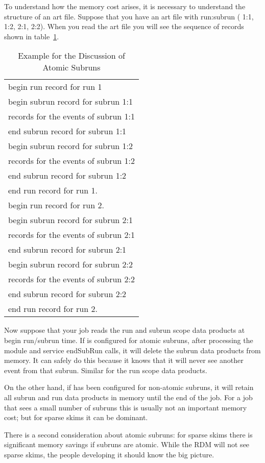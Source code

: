 To understand how the memory cost arises,
it is necessary to understand the structure of an art file.
Suppose that you have an art file with run:subrun ( 1:1, 1:2, 2:1, 2:2).
When you read the art file you will see the sequence of records shown
in table~\ref{tab:atomicsubruns}.

\begin{table}
\begin{center}
\caption[Example For Discussion of Atomic Subruns]{Example for the Discussion of Atomic Subruns}
\label{tab:atomicsubruns}
\begin{tabular}{l}\hline
  begin run record for run 1 \\
  begin subrun record for subrun 1:1 \\
  records for the events of subrun 1:1 \\
  end subrun record for subrun 1:1 \\
   begin subrun record for subrun 1:2 \\
   records for the events of subrun 1:2 \\
   end subrun record for subrun 1:2 \\
   end run record for run 1. \\ \hline
   begin run record for run 2. \\
   begin subrun record for subrun 2:1 \\
   records for the events of subrun 2:1 \\
   end subrun record for subrun 2:1 \\
   begin subrun record for subrun 2:2 \\
   records for the events of subrun 2:2 \\
   end subrun record for subrun 2:2 \\
   end run record for run 2. \\
   \hline
  \end{tabular}
\end{center}
\end{table}

Now suppose that your job reads the run and subrun scope data products at begin run/subrun time.
If \art is configured for atomic subruns, after processing the module and service
{\code endSubRun} calls, it will delete the subrun data products from memory. It can safely do this
because it knows that it will never see another event from that subrun.
Similar for the run scope data products.

On the other hand, if \art has been configured for non-atomic subruns, it will retain all subrun
and run data products in memory until the end of the job.
For a job that sees a small number of subruns this is usually not an important memory cost; but
for sparse skims it can be dominant.


There is a second consideration about atomic subruns:
for sparse skims there is significant memory savings if subruns are atomic.
While the RDM will not see sparse skims, the people developing it should know the big picture.


